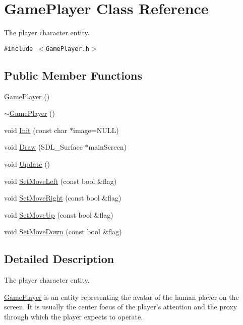 \hypertarget{class_game_player}{
\section{GamePlayer Class Reference}
\label{d7/df6/class_game_player}
}
The player character entity.  


{\tt \#include $<$GamePlayer.h$>$}

\subsection*{Public Member Functions}
\begin{CompactItemize}
\item 
\hyperlink{class_game_player_f0314668e232831d2f9c263596dccde6}{GamePlayer} ()
\item 
\hyperlink{class_game_player_ad6c1016873c9e4750ce370552541745}{$\sim$GamePlayer} ()
\item 
void \hyperlink{class_game_player_937dcf8e5b90200f5ae0a3418adf7271}{Init} (const char $\ast$image=NULL)
\item 
void \hyperlink{class_game_player_3e5c897e5120b5297e7226a4cb143742}{Draw} (SDL\_\-Surface $\ast$mainScreen)
\item 
void \hyperlink{class_game_player_55dbf88a7edd4c41de5591c0a3496847}{Update} ()
\item 
void \hyperlink{class_game_player_336298f2d286c4b2188bc9a03fac9c6d}{SetMoveLeft} (const bool \&flag)
\item 
void \hyperlink{class_game_player_c53032c2085250782126d5969a1cba32}{SetMoveRight} (const bool \&flag)
\item 
void \hyperlink{class_game_player_7f790b23e90b709061b91f840dce4982}{SetMoveUp} (const bool \&flag)
\item 
void \hyperlink{class_game_player_5caad1d0b2fff21b883f609cbdbd4575}{SetMoveDown} (const bool \&flag)
\end{CompactItemize}


\subsection{Detailed Description}
The player character entity. 

\hyperlink{class_game_player}{GamePlayer} is an entity representing the avatar of the human player on the screen. It is usually the center focus of the player's attention and the proxy through which the player expects to operate. 

